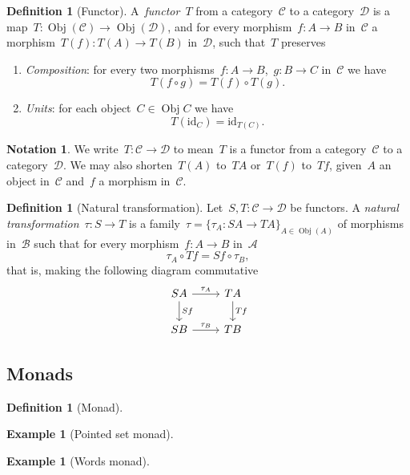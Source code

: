 \documentclass[a4paper]{article}
\theoremstyle{plain}
\newtheorem{example}[theorem]{Example}
\theoremstyle{definition}
\newtheorem{definition}[theorem]{Definition}
\newtheorem{notation}[theorem]{Notation}
\DeclareMathOperator{\Obj}{Obj}
\newcommand{\id}{\mathrm{id}}
\newcommand{\cat}[1]{\mathcal{#1}}
\begin{document}
\begin{definition}[Functor]
    \label{def:functor}
    A~\emph{functor}~\(T\) from a category~\(\cat{C}\) to a category~\(\cat{D}\)
    is a map~\(T:\Obj(\cat{C})\longrightarrow\Obj(\cat{D})\), and for every
    morphism~\(f:A\longrightarrow B\) in~\(\cat{C}\) a
    morphism~\(T(f):T(A)\longrightarrow T(B)\) in~\(\cat{D}\), such that~\(T\)
    preserves
    \begin{enumerate}
        \item \emph{Composition}: for every two
            morphisms~\(f:A\longrightarrow B\),~\(g:B\longrightarrow C\)
            in~\(\cat{C}\) we have
            \[
                T(f \circ g) = T(f) \circ T(g).
            \]
        \item \emph{Units}: for each object~\(C\in\Obj{C}\) we have
            \[
                T(\id_{C}) = \id_{T(C)}.
            \]
    \end{enumerate}
\end{definition}

\begin{notation}
    We write~\(T:\cat{C}\longrightarrow\cat{D}\) to mean~\(T\) is a functor from
    a category~\(\cat{C}\) to a category~\(\cat{D}\).
    We may also shorten~\(T(A)\) to~\(TA\) or~\(T(f)\) to~\(Tf\), given~\(A\) an
    object in~\(\cat{C}\) and~\(f\) a morphism in~\(\cat{C}\).
\end{notation}

\begin{definition}[Natural transformation]
    \label{def:natural-transformation}
    Let~\(S,T:\cat{C}\longrightarrow\cat{D}\) be functors. A \emph{natural
    transformation}~\(\tau:S\longrightarrow T\) is a
    family~\(\tau=\{\tau_{A}:SA\longrightarrow TA\}_{A\in\Obj(A)}\) of morphisms
    in~\(\cat{B}\) such that for every morphism~\(f:A\longrightarrow B\)
    in~\(\cat{A}\)
    \[
        \tau_{A} \circ Tf = Sf \circ \tau_{B},
    \]
    that is, making the following diagram commutative
    \[
        \begin{tikzcd}
            SA \arrow[r, "\tau_{A}"] \arrow[d, "Sf"] & TA \arrow[d, "Tf"] \\
            SB \arrow[r, "\tau_{B}"] & TB
        \end{tikzcd}
    \]
\end{definition}

\subsection{Monads}
\begin{definition}[Monad]
\end{definition}
\begin{example}[Pointed set monad]
\end{example}
\begin{example}[Words monad]
\end{example}
\end{document}
